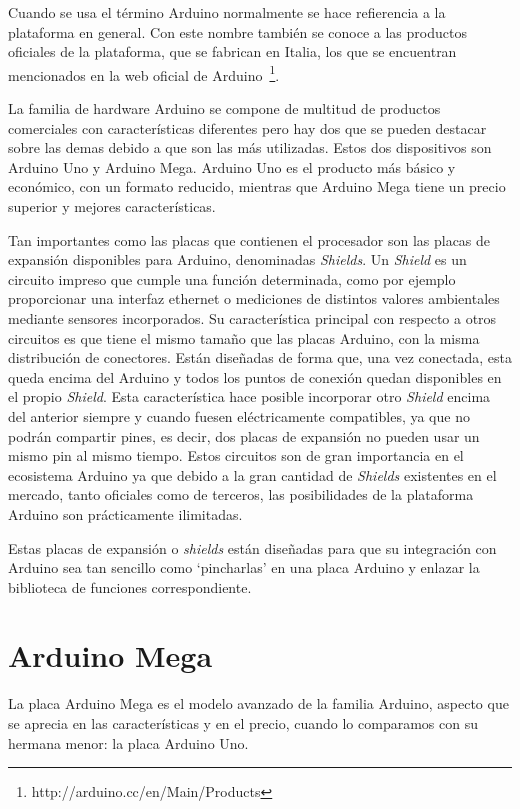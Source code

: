Cuando se usa el término Arduino normalmente se hace refierencia a la plataforma en general. Con este nombre también se conoce a las productos oficiales de la plataforma, que se fabrican en Italia, los que se encuentran mencionados en la web oficial de Arduino~\footnote{http://arduino.cc/en/Main/Products}.

La familia de hardware Arduino se compone de multitud de productos comerciales con características diferentes pero hay dos que se pueden destacar sobre las demas debido a que son las más utilizadas.  Estos dos dispositivos son Arduino Uno y Arduino Mega. Arduino Uno es el producto más básico y económico, con un formato reducido, mientras que Arduino Mega tiene un precio superior y mejores características.

Tan importantes como las placas que contienen el procesador son las placas de expansión disponibles para Arduino, denominadas \textit{Shields}. Un \textit{Shield} es un circuito impreso que cumple una función determinada, como por ejemplo proporcionar una interfaz ethernet o mediciones de distintos valores ambientales mediante sensores incorporados. Su característica principal con respecto a otros circuitos es que tiene el mismo tamaño que las placas Arduino, con la misma distribución de conectores. Están diseñadas de forma que, una vez conectada, esta queda encima del Arduino y todos los puntos de conexión quedan disponibles en el propio \textit{Shield}. Esta característica hace posible incorporar otro \textit{Shield} encima del anterior siempre y cuando fuesen eléctricamente compatibles, ya que no podrán compartir pines, es decir, dos placas de expansión no pueden usar un mismo pin al mismo tiempo. Estos circuitos son de gran importancia en el ecosistema Arduino ya que debido a la gran cantidad de \textit{Shields} existentes en el mercado, tanto oficiales como de terceros, las posibilidades de la plataforma Arduino son prácticamente ilimitadas.

Estas placas de expansión o \textit{shields} están diseñadas para que su integración con Arduino sea tan sencillo como `pincharlas'  en una placa Arduino y enlazar la biblioteca de funciones correspondiente.

\section{Arduino Mega}
La placa Arduino Mega es el modelo avanzado de la familia Arduino, aspecto que se aprecia en las características y en el precio, cuando lo comparamos con su hermana menor: la placa Arduino Uno.

